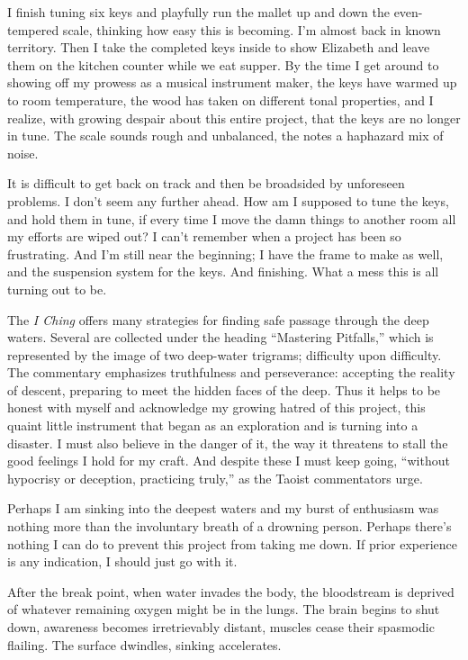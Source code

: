 \documentclass[letterpaper,10pt,headsepline]{scrreprt}
\begin{document}
I finish tuning six keys and playfully run the mallet up and down the even-tempered scale, thinking how easy this is becoming. I’m almost back in known territory. Then I take the completed keys inside to show Elizabeth and leave them on the kitchen counter while we eat supper. By the time I get around to showing off my prowess as a musical instrument maker, the keys have warmed up to room temperature, the wood has taken on different tonal properties, and I realize, with growing despair about this entire project, that the keys are no longer in tune. The scale sounds rough and unbalanced, the notes a haphazard mix of noise.

It is difficult to get back on track and then be broadsided by unforeseen problems. I ­don’t seem any further ahead. How am I supposed to tune the keys, and hold them in tune, if every time I move the damn things to another room all my efforts are wiped out? I ­can’t remember when a project has been so frustrating. And I’m still near the beginning; I have the frame to make as well, and the suspension system for the keys. And finishing. What a mess this is all turning out to be.

The \textit{I Ching} offers many strategies for finding safe passage through the deep waters. Several are collected under the heading “Mastering Pitfalls,” which is represented by the image of two deep-­water trigrams; diffi­culty upon difficulty. The commentary emphasizes truthfulness and perseverance: accepting the reality of descent, preparing to meet the hidden faces of the deep. Thus it helps to be honest with myself and acknowledge my growing hatred of this project, this quaint little instrument that began as an exploration and is turning into a disaster. I must also believe in the danger of it, the way it threatens to stall the good feelings I hold for my craft. And despite these I must keep going, “without hypocrisy or deception, practicing truly,” as the Taoist commentators urge.

Perhaps I am sinking into the deepest waters and my burst of enthusiasm was nothing more than the involuntary breath of a drowning person. Perhaps there’s nothing I can do to prevent this project from taking me down. If prior experience is any indication, I should just go with it.

After the break point, when water invades the body, the bloodstream is deprived of whatever remaining oxygen might be in the lungs. The brain begins to shut down, awareness becomes irretrievably distant, muscles cease their spasmodic flailing. The surface dwindles, sinking accelerates.
\end{document}
